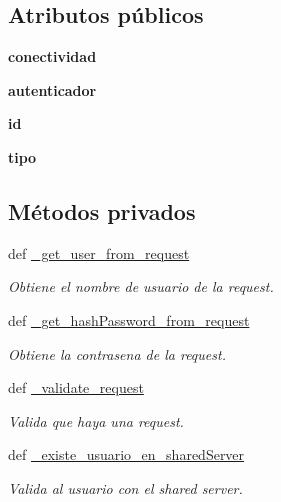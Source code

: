 \subsection*{Atributos públicos}
\begin{DoxyCompactItemize}
\item 
\hypertarget{classsrc_1_1resources_1_1auth_1_1_auth_ab31b5b7d3f7117c7030fb0bb13ec3d4e}{{\bfseries conectividad}}\label{classsrc_1_1resources_1_1auth_1_1_auth_ab31b5b7d3f7117c7030fb0bb13ec3d4e}

\item 
\hypertarget{classsrc_1_1resources_1_1auth_1_1_auth_a6f941c20282acda0048ff950c20b6020}{{\bfseries autenticador}}\label{classsrc_1_1resources_1_1auth_1_1_auth_a6f941c20282acda0048ff950c20b6020}

\item 
\hypertarget{classsrc_1_1resources_1_1auth_1_1_auth_a454d6c5e4da3b215b9067a01b4b653ea}{{\bfseries id}}\label{classsrc_1_1resources_1_1auth_1_1_auth_a454d6c5e4da3b215b9067a01b4b653ea}

\item 
\hypertarget{classsrc_1_1resources_1_1auth_1_1_auth_a494e703175798885c56a25e8a203bba9}{{\bfseries tipo}}\label{classsrc_1_1resources_1_1auth_1_1_auth_a494e703175798885c56a25e8a203bba9}

\end{DoxyCompactItemize}
\subsection*{Métodos privados}
\begin{DoxyCompactItemize}
\item 
def \hyperlink{classsrc_1_1resources_1_1auth_1_1_auth_ad45756ae9f2bf3840d6fe69fc305f86d}{\-\_\-get\-\_\-user\-\_\-from\-\_\-request}
\begin{DoxyCompactList}\small\item\em Obtiene el nombre de usuario de la request. \end{DoxyCompactList}\item 
def \hyperlink{classsrc_1_1resources_1_1auth_1_1_auth_a85f8056c2198f62284ada1f9f40a72f2}{\-\_\-get\-\_\-hash\-Password\-\_\-from\-\_\-request}
\begin{DoxyCompactList}\small\item\em Obtiene la contrasena de la request. \end{DoxyCompactList}\item 
def \hyperlink{classsrc_1_1resources_1_1auth_1_1_auth_acd72657f2bddc8a60a3103f418460d57}{\-\_\-validate\-\_\-request}
\begin{DoxyCompactList}\small\item\em Valida que haya una request. \end{DoxyCompactList}\item 
def \hyperlink{classsrc_1_1resources_1_1auth_1_1_auth_ab140f80e50617f4d4f4a58b40391710f}{\-\_\-existe\-\_\-usuario\-\_\-en\-\_\-shared\-Server}
\begin{DoxyCompactList}\small\item\em Valida al usuario con el shared server. \end{DoxyCompactList}\end{DoxyCompactItemize}


